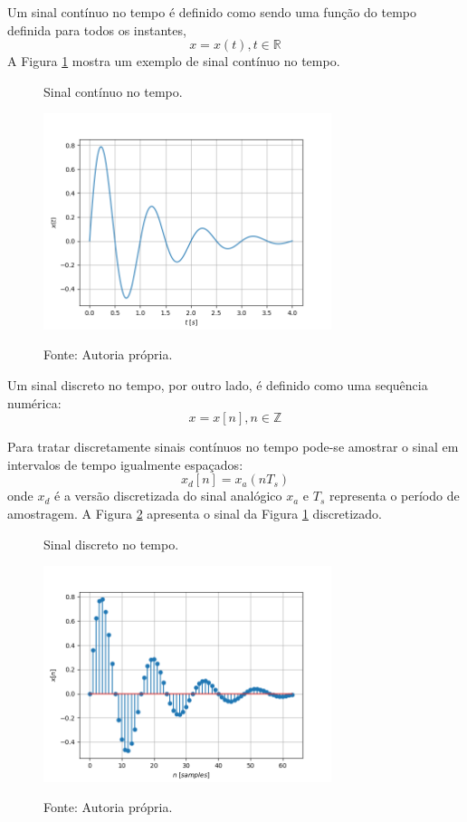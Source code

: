 \documentclass[12pt,a4paper]{report}
\begin{document}
  Um sinal contínuo no tempo é definido como sendo uma função do tempo definida para todos os instantes,
  \begin{equation}
    x = x(t), t \in \mathbb{R}
  \end{equation}
  A Figura \ref{fig:continuous} mostra um exemplo de sinal contínuo no tempo.
  \begin{figure}[H]
    \caption{Sinal contínuo no tempo.}
    \centering
    \includegraphics[width=0.75\textwidth]{continuous}
    \label{fig:continuous}
    \caption*{Fonte: Autoria própria.}
  \end{figure}

  Um sinal discreto no tempo, por outro lado, é definido como uma sequência numérica:
  \begin{equation}
    x = x[n], n \in \mathbb{Z}
  \end{equation}

  Para tratar discretamente sinais contínuos no tempo pode-se amostrar o sinal em intervalos de tempo igualmente
  espaçados:
  \begin{equation}
    x_d[n] = x_a(n T_s)
  \end{equation}
  onde $x_d$ é a versão discretizada do sinal analógico $x_a$ e $T_s$ representa o período de amostragem.
  A Figura \ref{fig:discrete} apresenta o sinal da Figura \ref{fig:continuous} discretizado.
  \begin{figure}[H]
    \caption{Sinal discreto no tempo.}
    \centering
    \includegraphics[width=0.75\textwidth]{discrete}
    \label{fig:discrete}
    \caption*{Fonte: Autoria própria.}
  \end{figure}
\end{document}
